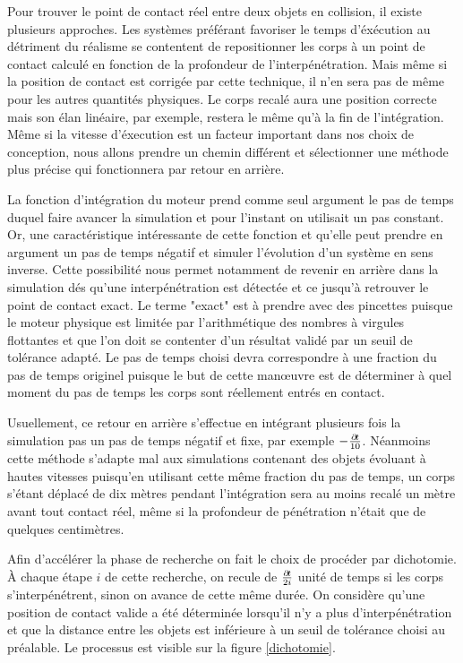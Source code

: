 Pour trouver le point de contact réel entre deux objets en collision,
il existe plusieurs approches. Les systèmes préférant favoriser le
temps d'éxécution au détriment du réalisme se contentent de
repositionner les corps à un point de contact calculé en fonction de
la profondeur de l'interpénétration. Mais même si la position de
contact est corrigée par cette technique, il n'en sera pas de même
pour les autres quantités physiques. Le corps recalé aura une position
correcte mais son élan linéaire, par exemple, restera le même qu'à la
fin de l'intégration.  Même si la vitesse d'éxecution est un facteur
important dans nos choix de conception, nous allons prendre un chemin
différent et sélectionner une méthode plus précise qui fonctionnera
par retour en arrière.

La fonction d'intégration du moteur prend comme seul argument le pas
de temps duquel faire avancer la simulation et pour l'instant on
utilisait un pas constant. Or, une caractéristique intéressante de
cette fonction et qu'elle peut prendre en argument un pas de temps
négatif et simuler l'évolution d'un système en sens inverse. Cette
possibilité nous permet notamment de revenir en arrière dans la
simulation dés qu'une interpénétration est détectée et ce jusqu'à
retrouver le point de contact exact. Le terme "exact" est à prendre
avec des pincettes puisque le moteur physique est limitée par
l'arithmétique des nombres à virgules flottantes et que l'on doit se
contenter d'un résultat validé par un seuil de tolérance adapté. Le
pas de temps choisi devra correspondre à une fraction du pas de temps
originel puisque le but de cette man\oe uvre est de déterminer à quel
moment du pas de temps les corps sont réellement entrés en contact.

Usuellement, ce retour en arrière s'effectue en intégrant plusieurs
fois la simulation pas un pas de temps négatif et fixe, par exemple
$-\frac{\partial \! t}{10}$. Néanmoins cette méthode s'adapte mal aux
simulations contenant des objets évoluant à hautes vitesses puisqu'en
utilisant cette même fraction du pas de temps, un corps s'étant
déplacé de dix mètres pendant l'intégration sera au moins recalé un
mètre avant tout contact réel, même si la profondeur de pénétration
n'était que de quelques centimètres.

Afin d'accélérer la phase de recherche on fait le choix de procéder
par dichotomie. \`A chaque étape $i$ de cette recherche, on recule de
$\frac{\partial \! t}{2i}$ unité de temps si les corps s'interpénétrent,
sinon on avance de cette même durée. On considère qu'une position de
contact valide a été déterminée lorsqu'il n'y a plus
d'interpénétration et que la distance entre les objets est inférieure
à un seuil de tolérance choisi au préalable. Le processus est visible
sur la figure \ref{dichotomie}.

